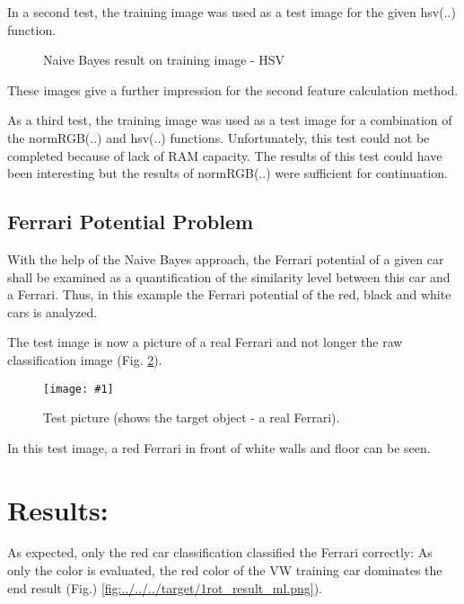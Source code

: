 \documentclass[a4paper,headings=small]{scrartcl}
\numberwithin{equation}{section} %
\numberwithin{figure}{section}   %
\newcommand{\image}[3]{
	\begin{figure}[htbp]
		\centering
		\texttt{[image: \#1]}
		\caption{#3}
		\label{fig:#1}
	\end{figure}
}
\newcommand{\generatedImgRoot}{../resources/img}
\newcommand{\generatedImgRootTwo}{../../../target}
\begin{document}
In a second test, the training image was used as a test image for the given hsv(..) function.

\begin{figure}
\hfill
{}
\caption{Naive Bayes result on training image - HSV}
\label{fig:label6}
\end{figure}

These images give a further impression for the second feature calculation method.

As a third test, the training image was used as a test image for a combination of the normRGB(..) and hsv(..) functions. Unfortunately, this test could not be completed because of lack of RAM capacity.
The results of this test could have been interesting but the results of normRGB(..) were sufficient for continuation.

\subsection{Ferrari Potential Problem}
With the help of the Naive Bayes approach, the Ferrari potential of a given car shall be examined as a quantification of the similarity level between this car and a Ferrari. Thus, in this example the Ferrari potential of the red, black and white cars is analyzed.


The test image is now a picture of a real Ferrari and not longer the raw classification image (Fig. \ref{fig:\generatedImgRoot/test_image1.jpeg}).

\image{\generatedImgRoot/test_image1.jpeg}{0.8}{%
		Test picture (shows the target object - a real Ferrari).}

In this test image, a red Ferrari in front of white walls and floor can be seen.

\section{Results:}

As expected, only the red car classification classified the Ferrari correctly: As only the color is evaluated, the red color of the VW training car dominates the end result
(Fig.) \ref{fig:\generatedImgRootTwo/1rot_result_ml.png}).
\end{document}
